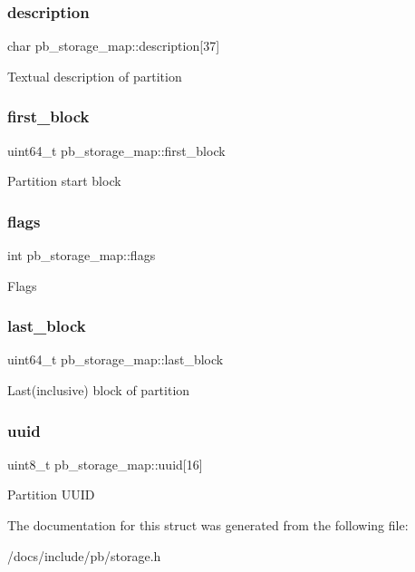 \subsubsection{\texorpdfstring{description}{description}}
{\footnotesize\ttfamily char pb\+\_\+storage\+\_\+map\+::description\mbox{[}37\mbox{]}}

Textual description of partition \mbox{\label{structpb__storage__map_a0186dcefcc1c5e2554ccfb369c213a62}} 
\subsubsection{\texorpdfstring{first\+\_\+block}{first\_block}}
{\footnotesize\ttfamily uint64\+\_\+t pb\+\_\+storage\+\_\+map\+::first\+\_\+block}

Partition start block \mbox{\label{structpb__storage__map_a766fb83ed4a54c8e04242ed9ff7acaff}} 
\subsubsection{\texorpdfstring{flags}{flags}}
{\footnotesize\ttfamily int pb\+\_\+storage\+\_\+map\+::flags}

Flags \mbox{\label{structpb__storage__map_a22da423ce1fa0596f6fab325c73e8230}} 
\subsubsection{\texorpdfstring{last\+\_\+block}{last\_block}}
{\footnotesize\ttfamily uint64\+\_\+t pb\+\_\+storage\+\_\+map\+::last\+\_\+block}

Last(inclusive) block of partition \mbox{\label{structpb__storage__map_a0491349496d1cda5ccc5b80309acb510}} 
\subsubsection{\texorpdfstring{uuid}{uuid}}
{\footnotesize\ttfamily uint8\+\_\+t pb\+\_\+storage\+\_\+map\+::uuid\mbox{[}16\mbox{]}}

Partition U\+U\+ID 

The documentation for this struct was generated from the following file\+:\begin{DoxyCompactItemize}
\item 
/docs/include/pb/storage.\+h\end{DoxyCompactItemize}
